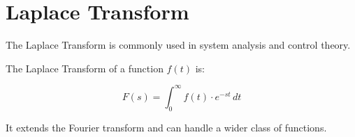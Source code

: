 \section{Laplace Transform}

The Laplace Transform is commonly used in system analysis and control theory.

The Laplace Transform of a function \( f(t) \) is:

\[
F(s) = \int_0^{\infty} f(t) \cdot e^{-st} \, dt
\]

It extends the Fourier transform and can handle a wider class of functions.
